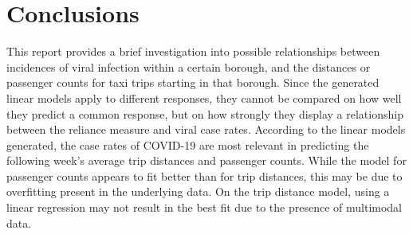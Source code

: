 \documentclass[11pt]{article}
\begin{document}




\section{Conclusions}

This report provides a brief investigation into possible relationships between
incidences of viral infection within a certain borough, 
and the distances or passenger counts for taxi trips starting in that borough.
Since the generated linear models apply to different responses, 
they cannot be compared on how well they predict a common response, 
but on how strongly they display a relationship between the reliance measure
and viral case rates.
According to the linear models generated, the case rates of COVID-19 
are most relevant in predicting the following week's average trip distances 
and passenger counts. 
While the model for passenger counts appears to fit better than for trip distances,
this may be due to overfitting present in the underlying data.
On the trip distance model, using a linear regression may not result in the best
fit due to the presence of multimodal data.
\end{document}
